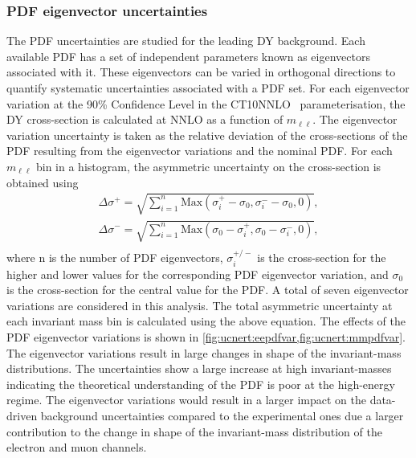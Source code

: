 \subsubsection{PDF eigenvector uncertainties}
The PDF uncertainties are studied for the leading DY background. Each available PDF has a set of independent parameters known as eigenvectors associated with it. These eigenvectors can be varied in orthogonal directions to quantify systematic uncertainties associated with a PDF set. For each eigenvector variation at the 90\% Confidence Level in the CT10NNLO~\cite{ct10} parameterisation, the DY cross-section is calculated at NNLO as a function of $m_{\ell\ell}$. The eigenvector variation uncertainty is taken as the relative deviation of the cross-sections of the PDF resulting from the eigenvector variations and the nominal PDF. For each $m_{\ell\ell}$ bin in a histogram, the asymmetric uncertainty on the cross-section is obtained using
\begin{equation}
    \begin{aligned}
    \Delta \sigma^+ = \sqrt{\sum^n_{i=1}\mathrm{Max}\left(\sigma_i^+ - \sigma_0, \sigma^-_i - \sigma_0,0     \right)}, \\
    \Delta \sigma^- = \sqrt{\sum^n_{i=1}\mathrm{Max}\left(\sigma_0 - \sigma_i^+, \sigma_0 -\sigma^-_i,0  \right)}, \\
    \end{aligned}
\end{equation}
where n is the number of PDF eigenvectors, $\sigma_i^{+/-}$ is the cross-section for the higher and lower values for the corresponding PDF eigenvector variation, and $\sigma_0$ is the cross-section for the central value for the PDF. A total of seven eigenvector variations are considered in this analysis. The total asymmetric uncertainty at each invariant mass bin is calculated using the above equation. The effects of the PDF eigenvector variations is shown in \cref{fig:ucnert:eepdfvar,fig:ucnert:mmpdfvar}. The eigenvector variations result in large changes in shape of the invariant-mass distributions. The uncertainties show a large increase at high invariant-masses indicating the theoretical understanding of the PDF is poor at the high-energy regime. The eigenvector variations would result in a larger impact on the data-driven background uncertainties compared to the experimental ones due a larger contribution to the change in shape of the invariant-mass distribution of the electron and muon channels. 

